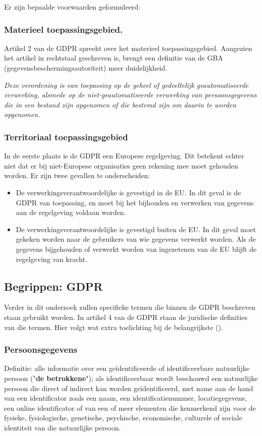 Er zijn bepaalde voorwaarden geformuleerd: 
\subsubsection{Materieel toepassingsgebied.}
Artikel 2 van de GDPR spreekt over het materieel toepassingsgebied. Aangezien het artikel in rechtstaal geschreven is, brengt een definitie van de GBA (gegevensbeschermingsautoriteit) meer duidelijkheid. 

\textit{Deze verordening is van toepassing op de geheel of gedeeltelijk geautomatiseerde verwerking, alsmede op de niet-geautomatiseerde verwerking van persoonsgegevens die in een bestand zijn opgenomen of die bestemd zijn om daarin te worden opgenomen.}

\subsubsection{Territoriaal toepassingsgebied}
In de eerste plaats is de GDPR een Europese regelgeving. Dit betekent echter niet dat er bij niet-Europese organisaties geen rekening mee moet gehouden worden. Er zijn twee gevallen te onderscheiden: 

\begin{itemize}
	\item De verwerkingsverantwoordelijke is gevestigd in de EU. 
	\subitem In dit geval is de GDPR van toepassing, en moet bij het bijhouden en verwerken van gegevens aan de regelgeving voldaan worden. 
	\item De verwerkingsverantwoordelijke is gevestigd buiten de EU. 
	\subitem In dit geval moet gekeken worden naar de gebruikers van wie gegevens verwerkt worden. Als de gegevens bijgehouden of verwerkt worden van ingezetenen van de EU blijft de regelgeving van kracht. 
\end{itemize}

\subsection{{Begrippen: GDPR}} 
Verder in dit onderzoek zullen specifieke termen die binnen de GDPR beschreven staan gebruikt worden.
In artikel 4 van de GDPR staan de juridische definities van die termen. Hier volgt wat extra toelichting bij de belangrijkste (\textcite{Parlement2016}). 

\subsubsection{Persoonsgegevens} 
Definitie: alle informatie over een geïdentificeerde of identificeerbare natuurlijke persoon ("\textbf{de betrokkene}"); als identificeerbaar wordt beschouwd een natuurlijke persoon die direct of indirect kan worden geïdentificeerd, met name aan de hand van een identificator zoals een naam, een identificatienummer, locatiegegevens, een online identificator of van een of meer elementen die kenmerkend zijn voor de fysieke, fysiologische, genetische, psychische, economische, culturele of sociale identiteit van die natuurlijke persoon.

